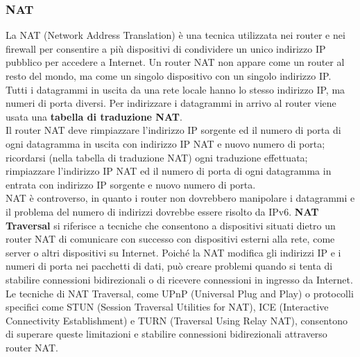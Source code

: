 \documentclass[11pt]{article}
\begin{document}
\subsubsection{NAT}
La NAT (Network Address Translation) è una tecnica utilizzata nei router e nei firewall per consentire a più dispositivi 
di condividere un unico indirizzo IP pubblico per accedere a Internet. Un router NAT non appare come un router al resto 
del mondo, ma come un singolo dispositivo con un singolo indirizzo IP. Tutti i datagrammi in uscita da una rete locale 
hanno lo stesso indirizzo IP, ma numeri di porta diversi. Per indirizzare i datagrammi in arrivo al router viene usata 
una \textbf{tabella di traduzione NAT}.\\
Il router NAT deve rimpiazzare l'indirizzo IP sorgente ed il numero di porta di ogni datagramma in uscita con indirizzo 
IP NAT e nuovo numero di porta; ricordarsi (nella tabella di traduzione NAT) ogni traduzione effettuata; rimpiazzare 
l'indirizzo IP NAT ed il numero di porta di ogni datagramma in entrata con indirizzo IP sorgente e nuovo numero di porta.\\
NAT è controverso, in quanto i router non dovrebbero manipolare i datagrammi e il problema del numero di indirizzi dovrebbe 
essere risolto da IPv6. \textbf{NAT Traversal} si riferisce a tecniche che consentono a dispositivi situati 
dietro un router NAT di comunicare con successo con dispositivi esterni alla rete, come server o altri dispositivi su Internet. 
Poiché la NAT modifica gli indirizzi IP e i numeri di porta nei pacchetti di dati, può creare problemi quando si tenta di 
stabilire connessioni bidirezionali o di ricevere connessioni in ingresso da Internet. Le tecniche di NAT Traversal, come 
UPnP (Universal Plug and Play) o protocolli specifici come STUN (Session Traversal Utilities for NAT), ICE (Interactive 
Connectivity Establishment) e TURN (Traversal Using Relay NAT), consentono di superare queste limitazioni e stabilire 
connessioni bidirezionali attraverso router NAT.
\end{document}
